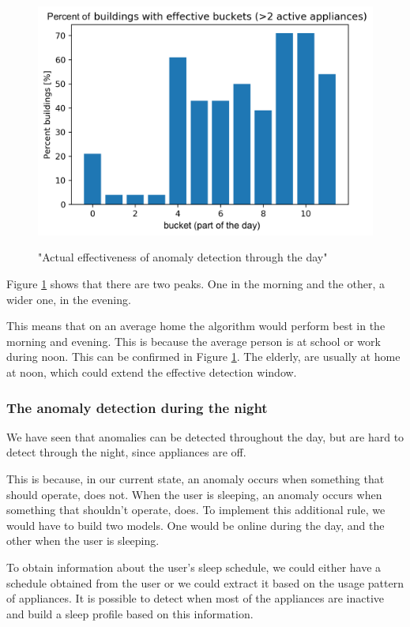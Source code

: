 \begin{figure}[H]
	\centering
	\caption{"Actual effectiveness of anomaly detection through the day"}
	\includegraphics[width=.8\textwidth]{Figures/EC/all_ignored_buckets_dist_incl_act.png}
	\label{fig:ignored_buckets_act}
\end{figure}

Figure \ref{fig:ignored_buckets_act} shows that there are two peaks.
One in the morning and the other, a wider one, in the evening.

This means that on an average home the algorithm would perform best in the morning and evening.
This is because the average person is at school or work during noon. 
This can be confirmed in Figure \ref{fig:ignored_buckets_act}.
The elderly, are usually at home at noon, which could extend the effective detection window.


\subsubsection{The anomaly detection during the night}

We have seen that anomalies can be detected throughout the day,
but are hard to detect through the night, since appliances are off.

This is because, in our current state, an anomaly occurs when something that should operate, does not.
When the user is sleeping, an anomaly occurs when something that shouldn't operate, does. 
To implement this additional rule, we would have to build two models.
One would be online during the day, and the other when the user is sleeping.

To obtain information about the user's sleep schedule, we could either have a schedule obtained from the user or we could extract it based on the usage pattern of appliances.
It is possible to detect when most of the appliances are inactive and build a sleep profile based on this information.


